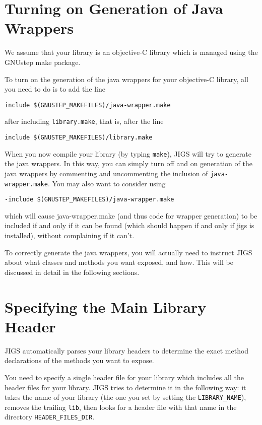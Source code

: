 \section{Turning on Generation of Java Wrappers}
We assume that your library is an objective-C library which is managed
using the GNUstep make package.

To turn on the generation of the java wrappers for your objective-C
library, all you need to do is to add the line
\begin{verbatim}
include $(GNUSTEP_MAKEFILES)/java-wrapper.make
\end{verbatim}
after including \texttt{library.make}, that is, after the line
\begin{verbatim}
include $(GNUSTEP_MAKEFILES)/library.make
\end{verbatim}

When you now compile your library (by typing \texttt{make}), JIGS will
try to generate the java wrappers.  In this way, you can simply turn
off and on generation of the java wrappers by commenting and
uncommenting the inclusion of \texttt{java-wrapper.make}.  
You may also want to consider using 
\begin{verbatim}
-include $(GNUSTEP_MAKEFILES)/java-wrapper.make
\end{verbatim}
which will cause java-wrapper.make (and thus code for wrapper
generation) to be included if and only if it can be found (which
should happen if and only if jigs is installed), without complaining
if it can't.

To correctly generate the java wrappers, you will actually need to
instruct JIGS about what classes and methods you want exposed, and
how.  This will be discussed in detail in the following sections.

\section{Specifying the Main Library Header}
JIGS automatically parses your library headers to determine the exact
method declarations of the methods you want to expose.  

You need to specify a single header file for your library which
includes all the header files for your library.  JIGS tries to
determine it in the following way: it takes the name of your library 
(the one you set by setting the \texttt{LIBRARY\_NAME}), removes 
the trailing \texttt{lib}, then looks for a header file with that name 
in the directory \texttt{HEADER\_FILES\_DIR}. 

